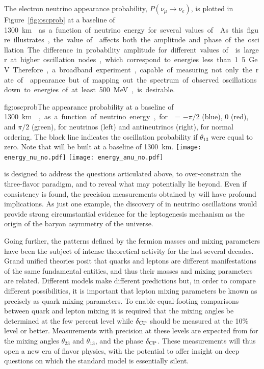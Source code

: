 The electron neutrino appearance probability, $P(\nu_\mu \rightarrow \nu_e)$, 
is plotted in 
Figure~\ref{fig:oscprob} at a baseline of \SI{1300}\km{} as a function of neutrino 
energy for several values of \deltacp. As this figure illustrates, the value 
of \deltacp affects both the amplitude and phase of
the oscillation. The difference in probability amplitude
for different values of \deltacp is larger at higher oscillation nodes, which 
correspond to energies less than 1.5~GeV. Therefore, a broadband experiment, 
capable of measuring not only the rate of \nue appearance but of mapping out the 
spectrum of observed oscillations down to energies of at least 500~MeV, is desirable. 

\begin{dunefigure}{fig:oscprob}{The appearance probability at a baseline of \SI{1300}\km{},
  as a function of neutrino energy, for \deltacp = $-\pi/2$ (blue), 
  0 (red), and $\pi/2$ (green), for neutrinos (left) and antineutrinos
  (right), for normal ordering. The black line indicates the oscillation
  probability if $\theta_{13}$ were equal to zero. Note that  will be built at a baseline of \SI{1300}{\km}.}
\texttt{[image: energy\_nu\_no.pdf]}
\texttt{[image: energy\_anu\_no.pdf]}
\end{dunefigure}



 is designed to address the questions articulated above, 
to over-constrain the three-flavor paradigm, 
and to reveal what may potentially lie beyond.  
Even if consistency is found, the precision measurements 
obtained by  will have profound implications. As just one example, 
the discovery of  in neutrino oscillations would provide 
strong circumstantial evidence for the leptogenesis mechanism as 
the origin of the baryon asymmetry of the universe.  

Going further, the patterns defined by the fermion masses and 
mixing parameters have been the subject of intense theoretical 
activity for the last several decades.  Grand unified theories 
posit that quarks and leptons are different manifestations of the same 
fundamental entities, and thus their masses and mixing parameters 
are related. Different models make different predictions but, 
in order to compare different possibilities, it is important that 
lepton mixing parameters be known as precisely as quark mixing parameters.
To enable equal-footing comparisons between quark and lepton mixing 
it is required 
that the mixing angles be determined at the few percent level 
while $\delta_{\rm CP}$ should be measured at the 10\% level or better.
Measurements with precision at these levels are expected from  
for the mixing angles $\theta_{23}$ and $\theta_{13}$, 
and the  phase $\delta_{\rm CP}$.   
These measurements will thus open a new era of flavor physics, 
with the potential to offer insight on deep questions on which the 
standard model is essentially silent.

